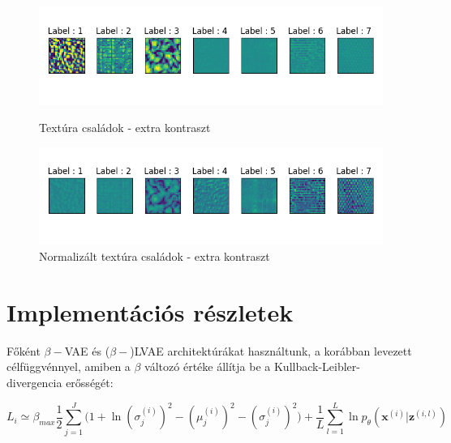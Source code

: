 \documentclass[12pt, english]{article}
\begin{document}
\begin{figure}[H]
  
  \begin{minipage}{0.48\linewidth}
    \centering
    \includegraphics[width=.95\linewidth]{default_contrast.png} 
    \caption{Textúra családok - extra kontraszt} 
  \end{minipage}%
  \begin{minipage}{0.48\linewidth}
    \centering
    \includegraphics[width=.95\linewidth]{normalized_contrast.png} 
    \caption{Normalizált textúra családok - extra kontraszt} 
  \end{minipage} 
\end{figure}

\newpage

\section{Implementációs részletek}

\vspace{7mm}

\par Főként $\beta-$VAE \cite{burgess2018understanding} és ($\beta-$)LVAE architektúrákat használtunk, a korábban levezett célfüggvénnyel, amiben a $\beta$ változó értéke állítja be a Kullback-Leibler-divergencia erősségét:

\vspace{4mm}

\begin{equation}
    L_{i} \simeq \beta_{max}\frac{1}{2}\sum_{j = 1}^{J}\Big( 1 + \ln(\sigma^{(i)}_{j})^{2} - (\mu^{(i)}_{j})^{2} - (\sigma^{(i)}_{j})^{2} \Big) + \frac{1}{L}\sum_{l=1}^{L}\ln p_{\theta}(\bm{x}^{(i)} | \bm{z}^{(i, l)})
\end{equation}

\vspace{5mm}
\end{document}
